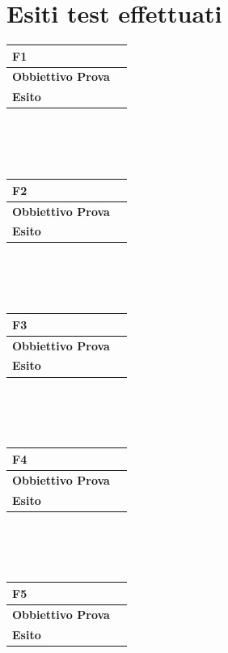 \documentclass[11pt,titlepage,a4paper]{report}
\begin{document}
\section {Esiti test effettuati}
\begin{tabular}{||p{4.5cm}||p{7.5cm}||}
\hline
\textbf{\textsf{F1}}& \\
\hline
{\textbf {Obbiettivo Prova}}& \\ \hline
{\textbf{Esito}}&  \\ \hline
\end{tabular} \\
\\
\\
\begin{tabular}{||p{4.5cm}||p{7.5cm}||}
\hline
\textbf{\textsf{F2}}& \\
\hline
{\textbf {Obbiettivo Prova}}& \\ \hline
{\textbf{Esito}}&  \\ \hline
\end{tabular} \\
\\
\\
\begin{tabular}{||p{4.5cm}||p{7.5cm}||}
\hline
\textbf{\textsf{F3}}& \\
\hline
{\textbf {Obbiettivo Prova}}& \\ \hline
{\textbf{Esito}}&  \\ \hline
\end{tabular} \\
\\
\\
\begin{tabular}{||p{4.5cm}||p{7.5cm}||}
\hline
\textbf{\textsf{F4}}& \\
\hline
{\textbf {Obbiettivo Prova}}& \\ \hline
{\textbf{Esito}}&  \\ \hline
\end{tabular} \\
\\
\\
\begin{tabular}{||p{4.5cm}||p{7.5cm}||}
\hline
\textbf{\textsf{F5}}& \\
\hline
{\textbf {Obbiettivo Prova}}& \\ \hline
{\textbf{Esito}}&  \\ \hline
\end{tabular} \\
\\
\end{document}
